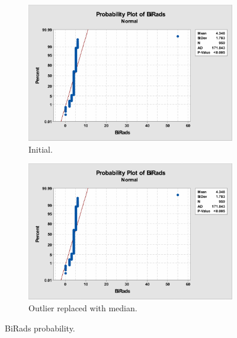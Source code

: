 \documentclass[12pt]{article}
\begin{document}
    \begin{figure}[H]
      \begin{subfigure}[b]{0.45\textwidth}
        \includegraphics[width=\textwidth]{birads-probability}
        \caption{Initial.}
        \label{fig:birads-probability}
      \end{subfigure}
      \hfill
      \begin{subfigure}[b]{0.45\textwidth}
        \includegraphics[width=\textwidth]{birads-probability}
        \caption{Outlier replaced with median.}
        \label{fig:birads-probability}
      \end{subfigure}
      \caption{BiRads probability.}
    \end{figure}
\end{document}
